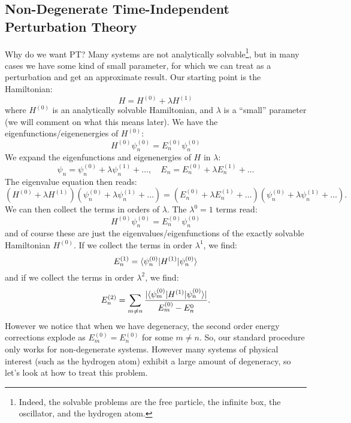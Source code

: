 \subsection{Non-Degenerate Time-Independent Perturbation Theory}
Why do we want PT? Many systems are not analytically solvable\footnote{Indeed, the solvable problems are the free particle, the infinite box, the oscillator, and the hydrogen atom.}, but in many cases we have some kind of small parameter, for which we can treat as a perturbation and get an approximate result. Our starting point is the Hamiltonian:
\begin{equation}
    H = H^{(0)} + \lambda H^{(1)}
\end{equation}
where $H^{(0)}$ is an analytically solvable Hamiltonian, and $\lambda$ is a ``small'' parameter (we will comment on what this means later). We have the eigenfunctions/eigenenergies of $H^{(0)}$:
\begin{equation}
    H^{(0)}\psi^{(0)}_n = E_n^{(0)}\psi_n^{(0)}
\end{equation}
We expand the eigenfunctions and eigenenergies of $H$ in $\lambda$:
\begin{equation}
    \psi_n = \psi_n^{(0)} + \lambda \psi_n^{(1)} + \ldots, \quad E_n = E_n^{(0)} + \lambda E_n^{(1)} + \ldots
\end{equation}
The eigenvalue equation then reads:
\begin{equation}\label{eq-pertexpansion}
    (H^{(0)} + \lambda H^{(1)})(\psi_n^{(0)} + \lambda \psi_n^{(1)} + \ldots) = (E_n^{(0)} + \lambda E_n^{(1)} + \ldots)(\psi_n^{(0)} + \lambda \psi_n^{(1)} + \ldots).
\end{equation}
We can then collect the terms in orders of $\lambda$. The $\lambda^0 = 1$ terms read:
\begin{equation}
    H^{(0)}\psi^{(0)}_n = E_n^{(0)}\psi_n^{(0)}
\end{equation}
and of course these are just the eigenvalues/eigenfunctions of the exactly solvable Hamiltonian $H^{(0)}$. If we collect the terms in order $\lambda^1$, we find:
\begin{equation}
    E_n^{(1)} = \langle \psi_n^{(0)} \rvert H^{(1)}\lvert \psi_n^{(0)} \rangle
\end{equation}
and if we collect the terms in order $\lambda^2$, we find:
\begin{equation}
    E_n^{(2)} = \sum_{m \neq n}\frac{\lvert \langle \psi_m^{(0)} \rvert H^{(1)}\lvert \psi_n^{(0)} \rangle \rvert}{E_m^{(0)} - E_n^{0}}.
\end{equation}
However we notice that when we have degeneracy, the second order energy corrections explode as $E_m^{(0)} = E_n^{(0)}$ for some $m \neq n$. So, our standard procedure only works for non-degenerate systems. However many systems of physical interest (such as the hydrogen atom) exhibit a large amount of degeneracy, so let's look at how to treat this problem.

